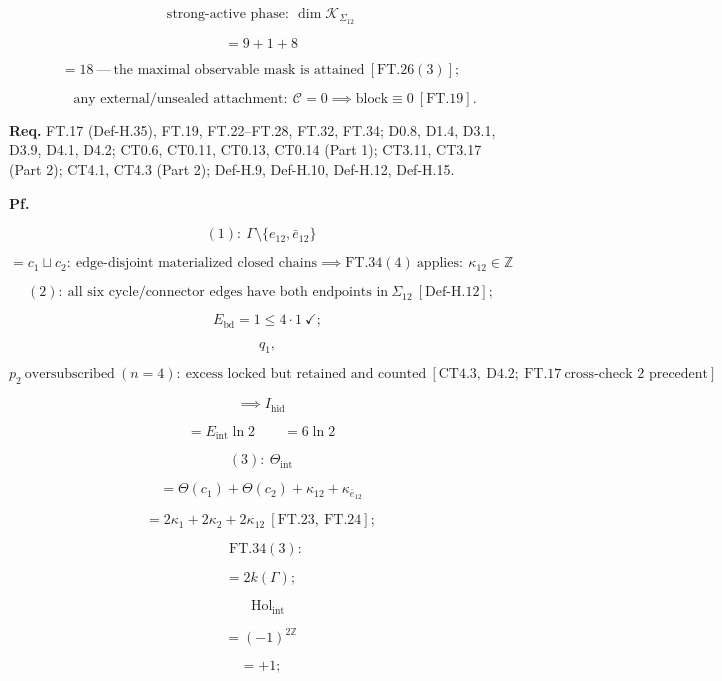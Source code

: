 \begin{theorem}
\[
\text{strong-active phase}:\ \dim\mathcal K_{\Sigma_{12}}
\]

\[
= 9+1+8
\]

\[
= 18\ —\ \text{the maximal observable mask is attained}\ [\mathrm{FT.26}(3)];
\]

\[
\qquad \text{any external/unsealed attachment}:\ \mathcal C=0\implies\text{block}\equiv0\ [\mathrm{FT.19}].
\]

\textbf{Req.} FT.17 (Def-H.35), FT.19, FT.22–FT.28, FT.32, FT.34; D0.8, D1.4, D3.1, D3.9, D4.1, D4.2; CT0.6, CT0.11, CT0.13, CT0.14 (Part 1); CT3.11, CT3.17 (Part 2); CT4.1, CT4.3 (Part 2); Def-H.9, Def-H.10, Def-H.12, Def-H.15.

\textbf{Pf.}

\[
(1):\ \Gamma\setminus\{e_{12},\bar e_{12}\}
\]

\[
= c_1\sqcup c_2:\ \text{edge-disjoint materialized closed chains}\implies\mathrm{FT.34}(4)\ \text{applies}:\ \kappa_{12}\in\mathbb Z
\]

\[
(2):\ \text{all six cycle/connector edges have both endpoints in}\ \Sigma_{12}\ [\mathrm{Def\text{-}H.12}];
\]

\[
\quad E_{\mathrm{bd}}=1\le4\cdot1\ \checkmark;
\]

\[
\quad q_1,
\]

\[
p_2\ \text{oversubscribed}\ (n{=}4):\ \text{excess locked but retained and counted}\ [\mathrm{CT4.3},\ \mathrm{D4.2};\ \mathrm{FT.17}\ \text{cross-check 2 precedent}]
\]

\[
\implies I_{\mathrm{hid}}
\]

\[
= E_{\mathrm{int}}\ln2\qquad = 6\ln2
\]

\[
(3):\ \Theta_{\mathrm{int}}
\]

\[
= \Theta(c_1)+\Theta(c_2)+\kappa_{12}+\kappa_{\bar e_{12}}
\]

\[
= 2\kappa_1+2\kappa_2+2\kappa_{12}\ [\mathrm{FT.23},\ \mathrm{FT.24}];
\]

\[
\quad\mathrm{FT.34}(3):\
\]

\[
= 2k(\Gamma);
\]

\[
\quad\mathrm{Hol}_{\mathrm{int}}
\]

\[
= (-1)^{2\mathbb Z}
\]

\[
= +1;
\]


\end{theorem}
